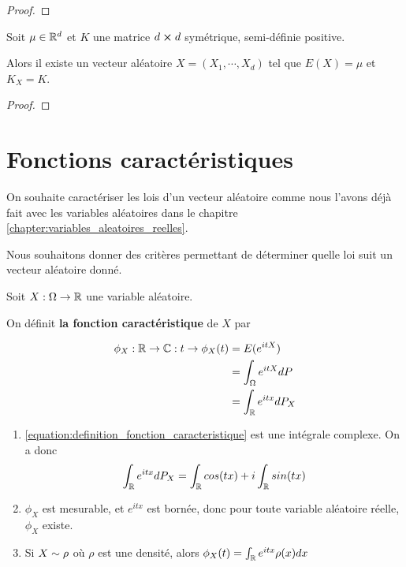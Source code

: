 \ifdefined\outputproof
\begin{proof}

\end{proof}
\fi

\begin{theorem}
	Soit $\mu \in \mathbb{R}^{d}$ et $K$ une matrice $d \cross d$ symétrique,
	semi-définie positive.

	Alors il existe un vecteur aléatoire $X = (X_{1}, \cdots, X_{d})$ tel que
	$E(X) = \mu$ et $K_{X} = K$.
\end{theorem}

\ifdefined\outputproof
\begin{proof}

\end{proof}
\fi


\section{Fonctions caractéristiques}

On souhaite caractériser les lois d'un vecteur aléatoire comme nous l'avons déjà
fait avec les variables aléatoires dans le chapitre
\ref{chapter:variables_aleatoires_reelles}.

Nous souhaitons donner des critères permettant de déterminer quelle loi suit un
vecteur aléatoire donné.

\begin{definition}
	Soit $X : \Omega \rightarrow \mathbb{R}$ une variable aléatoire.

	On définit \textbf{la fonction caractéristique} de $X$ par

	\begin{align}
		\phi_{X} : \mathbb{R} \rightarrow \mathbb{C} : t \rightarrow
		\phi_{X}(t) & = E(e^{i t X}) \\
		& = \int_{\Omega} e^{it X} dP \\
		& = \int_{\mathbb{R}} e^{it x} dP_{X}
		\label{equation:definition_fonction_caracteristique}
	\end{align}
\end{definition}

\begin{remarque}
	\begin{enumerate}
		\item \ref{equation:definition_fonction_caracteristique} est une
			intégrale complexe. On a donc
			\begin{equation}
				\int_{\mathbb{R}}e^{itx} dP_{X} = \int_{\mathbb{R}}cos(tx) + i
				\int_{\mathbb{R}} sin(tx)
			\end{equation}
		\item $\phi_{X}$ est mesurable, et $e^{itx}$ est bornée, donc pour toute
			variable aléatoire réelle, $\phi_{X}$ existe.
		\item Si $X \sim \rho$ où $\rho$ est une densité, alors $\phi_{X}(t) = \int_{\mathbb{R}} e^{itx}
			\rho(x) dx$
	\end{enumerate}
\end{remarque}

